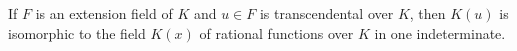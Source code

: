 If $F$ is an extension field of $K$ and $u \in F$ is transcendental over $K$, then $K(u)$ is isomorphic to the field $K(x)$ of rational functions over $K$ in one indeterminate.
